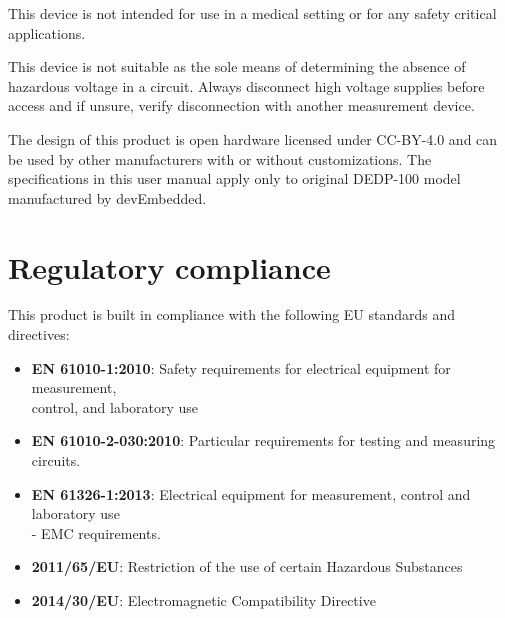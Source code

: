 \documentclass[10pt]{manual}
\begin{document}
This device is not intended for use in a medical setting or for any safety critical applications.

This device is not suitable as the sole means of determining the absence of hazardous voltage in a circuit.
Always disconnect high voltage supplies before access and if unsure, verify disconnection with another measurement device.

The design of this product is open hardware licensed under CC-BY-4.0 and can be used by other manufacturers with or without customizations.
The specifications in this user manual apply only to original DEDP-100 model manufactured by devEmbedded.

\section{Regulatory compliance}
This product is built in compliance with the following EU standards and directives:

\begin{itemize}
    \item \textbf{EN 61010-1:2010}: Safety requirements for electrical equipment for measurement,\\control, and laboratory use
    \item \textbf{EN 61010-2-030:2010}: Particular requirements for testing and measuring circuits.
    \item \textbf{EN 61326-1:2013}: Electrical equipment for measurement, control and laboratory use \\ - EMC requirements.
    \item \textbf{2011/65/EU}: Restriction of the use of certain Hazardous Substances
    \item \textbf{2014/30/EU}: Electromagnetic Compatibility Directive
\end{itemize}
\end{document}
